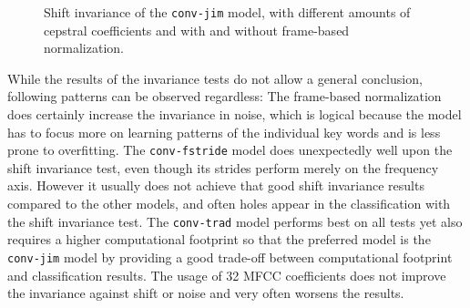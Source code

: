 \begin{figure}[!ht]
  \centering
  \caption{Shift invariance of the \texttt{conv-jim} model, with different amounts of cepstral coefficients and with and without frame-based normalization.}
  \label{fig:exp_fs_cepstral_tb_shift_conv-jim}
\end{figure}
\FloatBarrier
\noindent
While the results of the invariance tests do not allow a general conclusion, following patterns can be observed regardless:
The frame-based normalization does certainly increase the invariance in noise, which is logical because the model has to focus more on learning patterns of the individual key words and is less prone to overfitting.
The \texttt{conv-fstride} model does unexpectedly well upon the shift invariance test, even though its strides perform merely on the frequency axis.
However it usually does not achieve that good shift invariance results compared to the other models, and often holes appear in the classification with the shift invariance test.
The \texttt{conv-trad} model performs best on all tests yet also requires a higher computational footprint so that the preferred model is the \texttt{conv-jim} model by providing a good trade-off between computational footprint and classification results.
The usage of 32 MFCC coefficients does not improve the invariance against shift or noise and very often worsens the results.


